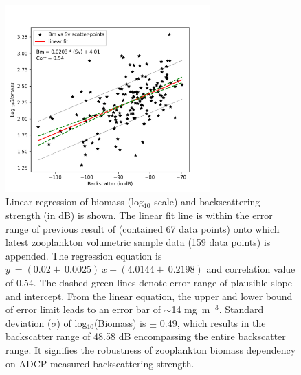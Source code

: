 \documentclass[authoryear,review,12pt]{elsarticle}
\begin{document}
\newpage
\begin{figure}[htbp]
	\centering
	\includegraphics[width=0.7\textwidth]{./figures/backscatter_vs_biomass.png} 
	\captionsetup{justification=justified,font=footnotesize,skip=0.05\baselineskip,width=0.8\textwidth}
	\caption{Linear regression of biomass (log$_{10}$ scale) and backscattering strength (in dB) is shown. The linear fit line is within the error range of previous result of \citep{aparna2022seasonal} (contained 67 data points) onto which latest zooplankton volumetric sample data (159 data points) is appended. The regression equation is $y\ = (0.02 \pm\ 0.0025) \ x + (4.0144 \pm \ 0.2198) $ and correlation value of 0.54. The dashed green lines denote error range of plausible slope and intercept. From the linear equation, the upper and lower bound of error limit leads to an error bar of $\sim$14  mg~m$^{-3}$. Standard deviation ($\sigma$) of log$_{10}$(Biomass) is $\pm$ 0.49, which results in the backscatter range of 48.58 dB encompassing the entire backscatter range. It signifies the robustness of zooplankton biomass dependency on ADCP measured backscattering strength.}
	\label{fig:bstobm}
\end{figure}

\newpage
\end{document}
